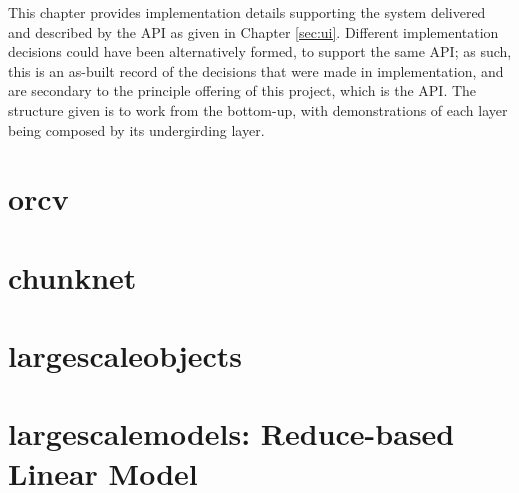 This chapter provides implementation details supporting the system delivered and described by the API as given in Chapter \cref{sec:ui}.
Different implementation decisions could have been alternatively formed, to support the same API; as such, this is an as-built record of the decisions that were made in implementation, and are secondary to the principle offering of this project, which is the API.
The structure given is to work from the bottom-up, with demonstrations of each layer being composed by its undergirding layer.

\section{orcv}

\section{chunknet}

\section{largescaleobjects}

\section{largescalemodels: Reduce-based Linear Model}

